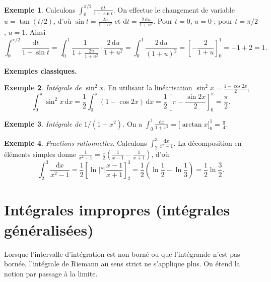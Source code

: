 \documentclass[12pt,a4paper,openany]{book}
\theoremstyle{definition}
\newtheorem{exemple}{Exemple}[chapter]
\newcommand{\abs}[1]{\left\lvert #1 \right\rvert}
\newcommand{\dd}{\mathrm{d}}
\begin{document}
\begin{exemple}\label{ex:cv3}
  Calculons $\displaystyle\int_0^{\pi/2} \frac{\dd t}{1 + \sin t}$.
  On effectue le changement de variable $u = \tan(t/2)$, d'où $\sin t = \frac{2u}{1+u^2}$ et $\dd t = \frac{2\,\dd u}{1+u^2}$. Pour $t = 0$, $u = 0$ ; pour $t = \pi/2$, $u = 1$. Ainsi
  \[
    \int_0^{\pi/2}\frac{\dd t}{1+\sin t}
    = \int_0^1 \frac{1}{1 + \frac{2u}{1+u^2}}\cdot\frac{2\,\dd u}{1+u^2}
    = \int_0^1 \frac{2\,\dd u}{(1+u)^2}
    = \left[-\frac{2}{1+u}\right]_0^1 = -1 + 2 = 1.
  \]
\end{exemple}

\medskip

\noindent\textbf{Exemples classiques.}

\begin{exemple}\label{ex:sin2}
  \emph{Intégrale de $\sin^2 x$.} En utilisant la linéarisation $\sin^2 x = \frac{1 - \cos 2x}{2}$,
  \[
    \int_0^{\pi} \sin^2 x\,\dd x = \frac{1}{2}\int_0^{\pi}(1 - \cos 2x)\,\dd x = \frac{1}{2}\left[\pi - \frac{\sin 2x}{2}\right]_0^{\pi} = \frac{\pi}{2}.
  \]
\end{exemple}

\begin{exemple}\label{ex:arctan}
  \emph{Intégrale de $1/(1+x^2)$.} On a $\displaystyle\int_0^1 \frac{\dd x}{1+x^2} = \bigl[\arctan x\bigr]_0^1 = \frac{\pi}{4}$.
\end{exemple}

\begin{exemple}\label{ex:fractions-rationnelles}
  \emph{Fractions rationnelles.} Calculons $\displaystyle\int_2^3\frac{\dd x}{x^2 - 1}$.
  La décomposition en éléments simples donne $\frac{1}{x^2-1} = \frac{1}{2}\left(\frac{1}{x-1} - \frac{1}{x+1}\right)$, d'où
  \[
    \int_2^3 \frac{\dd x}{x^2-1} = \frac{1}{2}\left[\ln\abs*{\frac{x-1}{x+1}}\right]_2^3 = \frac{1}{2}\left(\ln\frac{1}{2} - \ln\frac{1}{3}\right) = \frac{1}{2}\ln\frac{3}{2}.
  \]
\end{exemple}

\section{Intégrales impropres (intégrales généralisées)}
\label{sec:integrales-impropres}

Lorsque l'intervalle d'intégration est non borné ou que l'intégrande n'est pas bornée, l'intégrale de Riemann au sens strict ne s'applique plus. On étend la notion par passage à la limite.
\end{document}
